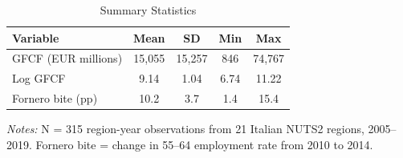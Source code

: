 \begin{table}[H]
\centering
\caption{Summary Statistics}
\label{tab:summary}
\small
\begin{threeparttable}
\begin{tabular}{lcccc}
\toprule
Variable & Mean & SD & Min & Max \\
\midrule
GFCF (EUR millions) & 15,055 & 15,257 & 846 & 74,767 \\
Log GFCF & 9.14 & 1.04 & 6.74 & 11.22 \\
Fornero bite (pp) & 10.2 & 3.7 & 1.4 & 15.4 \\
\bottomrule
\end{tabular}
\begin{tablenotes}[flushleft]
\footnotesize
\item \textit{Notes:} N = 315 region-year observations from 21 Italian NUTS2 regions, 2005--2019. Fornero bite = change in 55--64 employment rate from 2010 to 2014.
\end{tablenotes}
\end{threeparttable}
\end{table}
